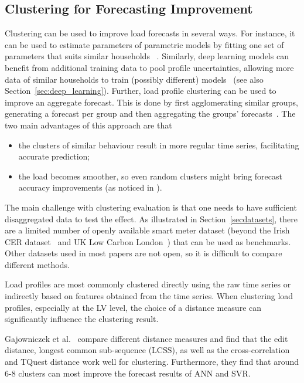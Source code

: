 \subsection{Clustering for Forecasting Improvement}
\label{sec:clustering}

Clustering can be used to improve load forecasts in several ways. For instance, it can be used to estimate parameters of parametric models by fitting one set of parameters that suits similar households ~\cite{Arora2016fes}. Similarly, deep learning models can benefit from additional training data to pool profile uncertainties, allowing more data of similar households to train (possibly different) models~\cite{Shi2017dlf,yang2020bdl} (see also Section~\ref{sec:deep_learning}). Further, load profile clustering can be used to improve an aggregate forecast. This is done by first agglomerating similar groups, generating a forecast per group and then aggregating the groups'  forecasts~\cite{Wijaya2015caf,Humeau2013elf,kurniawan2015cba,fahiman2017ilf,gajowniczek2018sso,alzate2013iel}. The two main advantages of this approach are that \begin{itemize}
	\item
	the clusters of similar behaviour result in more regular time series, facilitating accurate prediction;
	\item the load becomes smoother, so even random clusters might bring forecast accuracy improvements (as noticed in \cite{Wijaya2015caf}).
\end{itemize}
The main challenge with clustering evaluation is that one needs to have sufficient disaggregated data to test the effect. As illustrated in Section~\ref{secdatasets}, there are a limited number of openly available smart meter dataset (beyond the Irish CER dataset~\cite{Commission2012csm} and UK Low Carbon London~\cite{UK2014ulc}) that can be used as benchmarks. Other datasets used in most papers are not open, so it is difficult to compare different methods. 

Load profiles are most commonly clustered directly using the raw time series or indirectly based on features obtained from the time series. When clustering load profiles, especially at the LV level, the choice of a distance measure can significantly influence the clustering result. 

Gajowniczek et al.~\cite{gajowniczek2018sso} compare different distance measures and find that the edit distance, longest common sub-sequence (LCSS), as well as the cross-correlation and TQuest distance\cite{TQuest} work well for clustering. Furthermore, they find that around 6-8 clusters can most improve the forecast results of ANN and SVR. 

